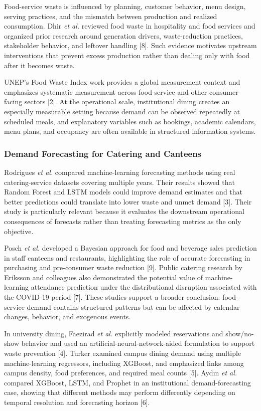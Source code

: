 \documentclass[conference]{IEEEtran}
\begin{document}
Food-service waste is influenced by planning, customer behavior, menu
design, serving practices, and the mismatch between production and
realized consumption. Dhir \emph{et al.} reviewed food waste in
hospitality and food services and organized prior research around
generation drivers, waste-reduction practices, stakeholder behavior, and
leftover handling {[}8{]}. Such evidence motivates upstream
interventions that prevent excess production rather than dealing only
with food after it becomes waste.

UNEP's Food Waste Index work provides a global measurement context and
emphasizes systematic measurement across food-service and other
consumer-facing sectors {[}2{]}. At the operational scale, institutional
dining creates an especially measurable setting because demand can be
observed repeatedly at scheduled meals, and explanatory variables such
as bookings, academic calendars, menu plans, and occupancy are often
available in structured information systems.

\subsubsection{Demand Forecasting for Catering and
Canteens}\label{demand-forecasting-for-catering-and-canteens}

Rodrigues \emph{et al.} compared machine-learning forecasting methods
using real catering-service datasets covering multiple years. Their
results showed that Random Forest and LSTM models could improve demand
estimates and that better predictions could translate into lower waste
and unmet demand {[}3{]}. Their study is particularly relevant because
it evaluates the downstream operational consequences of forecasts rather
than treating forecasting metrics as the only objective.

Posch \emph{et al.} developed a Bayesian approach for food and beverage
sales prediction in staff canteens and restaurants, highlighting the
role of accurate forecasting in purchasing and pre-consumer waste
reduction {[}9{]}. Public catering research by Eriksson and colleagues
also demonstrated the potential value of machine-learning attendance
prediction under the distributional disruption associated with the
COVID-19 period {[}7{]}. These studies support a broader conclusion:
food-service demand contains structured patterns but can be affected by
calendar changes, behavior, and exogenous events.

In university dining, Faezirad \emph{et al.} explicitly modeled
reservations and show/no-show behavior and used an
artificial-neural-network-aided formulation to support waste prevention
{[}4{]}. Turker examined campus dining demand using multiple
machine-learning regressors, including XGBoost, and emphasized links
among campus density, food preferences, and required meal counts
{[}5{]}. Aydın \emph{et al.} compared XGBoost, LSTM, and Prophet in an
institutional demand-forecasting case, showing that different methods
may perform differently depending on temporal resolution and forecasting
horizon {[}6{]}.
\end{document}
